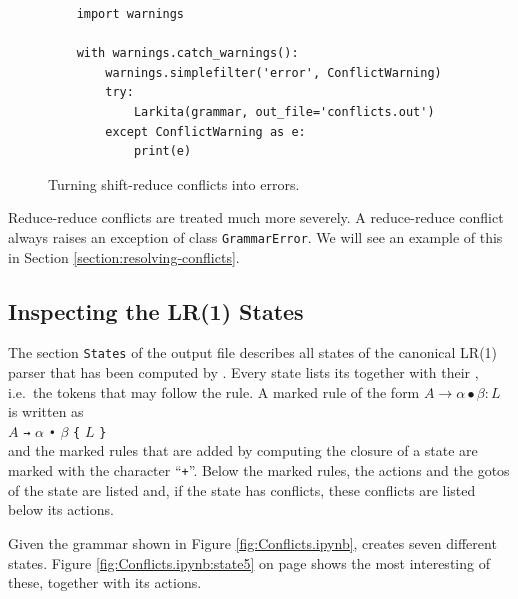 \begin{figure}[!ht]
\centering
\begin{verbatim}
    import warnings

    with warnings.catch_warnings():
        warnings.simplefilter('error', ConflictWarning)
        try:
            Larkita(grammar, out_file='conflicts.out')
        except ConflictWarning as e:
            print(e)
\end{verbatim}
\vspace*{-0.3cm}
\caption{Turning shift-reduce conflicts into errors.}
\label{fig:conflicts-strict}
\end{figure}
\FloatBarrier

\noindent
Reduce-reduce conflicts are treated much more severely.  A reduce-reduce conflict always raises an exception of
class \texttt{GrammarError}.  We will see an example of this in Section \ref{section:resolving-conflicts}.

\subsection{Inspecting the LR(1) States}
The section \texttt{States} of the output file describes all states of the canonical LR(1) parser that has been
computed by .  Every state lists its  together with their
, i.e.~the tokens that may follow the rule.  A marked rule of the form
$A \rightarrow \alpha \bullet \beta: L$ is written as
\\[0.2cm]
\hspace*{1.3cm}
$A$ \texttt{→} $\alpha$ \texttt{•} $\beta$ \texttt{\{} $L$ \texttt{\}}
\\[0.2cm]
and the marked rules that are added by computing the closure of a state are marked with the character
``\texttt{+}''.  Below the marked rules, the actions and the gotos of the state are listed and, if the state has
conflicts, these conflicts are listed below its actions.

Given the grammar shown in Figure \ref{fig:Conflicts.ipynb},  creates seven different states.
Figure \ref{fig:Conflicts.ipynb:state5} on page \pageref{fig:Conflicts.ipynb:state5} shows the most interesting
of these, together with its actions.

